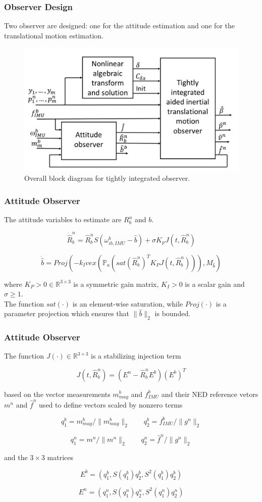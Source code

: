 \documentclass{beamer}
\begin{document}
	\begin{frame}
	\frametitle{Observer Design}
	Two observer are designed: one for the attitude estimation and one for the translational motion estimation. 
		\begin{figure}[H]
		\centering
		\includegraphics[scale=0.3]{observers}
		\caption{Overall block diagram for tightly integrated observer.}
	\end{figure}
	\end{frame}

	\begin{frame}
		\frametitle{Attitude Observer}
		The attitude variables to estimate are $R^n_b$ and $b$.
		
		\[ \dot{\hat{R}}^n_b  =  \hat{R}^n_b S(\omega^b_{ib,IMU} - \hat{b}) + \sigma K_pJ(t, \hat{R}^n_b)       \]
		
		\[ \dot{\hat{b}} = Proj(-k_I vex(\mathds{P}_a (sat(\hat{R}^n_b)^T K_P J(t, \hat{R}^n_b))),M_{\hat{b}} )           \]
		
		where $K_P > 0 \in \mathds{R}^{3\times 3}$ is a symmetric gain matrix, $K_I > 0$ is a scalar gain and $\sigma \geq 1$.\\ 
		
		The function $sat(\cdot)$ is an element-wise saturation, while $Proj(\cdot)$ is a parameter projection which ensures that $\|\hat{b} \|_2$ is bounded.
	\end{frame}

	\begin{frame}
 		\frametitle{Attitude Observer}
 		The function $J(\cdot) \in  \mathds{R}^{3\times 3}$ is a stabilizing injection term
 		
 		\[ J(t, \hat{R}^n_b)  = (E^n - \hat{R}^n_b E^b)(E^b)^T    \]
 		
 		based on the vector measurements $m^b_{mag}$ and $f^b_{IMU}$  and their NED reference vetors $m^n$ and $\hat{f}^n$ used to define vectors scaled by nonzero terms
 		
 		\[ q_1^b = m^b_{mag}/\|m^b_{mag}\|_2 \qquad q_2^b = f^b_{IMU}/\|g^n\|_2    \]
 		
 		\[ q_1^n = m^n/\|m^n\|_2 \qquad q_2^n = \hat{f}^n/\|g^n\|_2    \]
 		
 		and the $3\times3$ matrices
 		
 		\[ E^b = (q_1^b, S(q^b_1)q_2^b, S^2(q_1^b)q_2^b)    \]
 		
 		\[ E^n = (q_1^n, S(q^n_1)q_2^n, S^2(q_1^n)q_2^n)    \]
	\end{frame}
\end{document}
